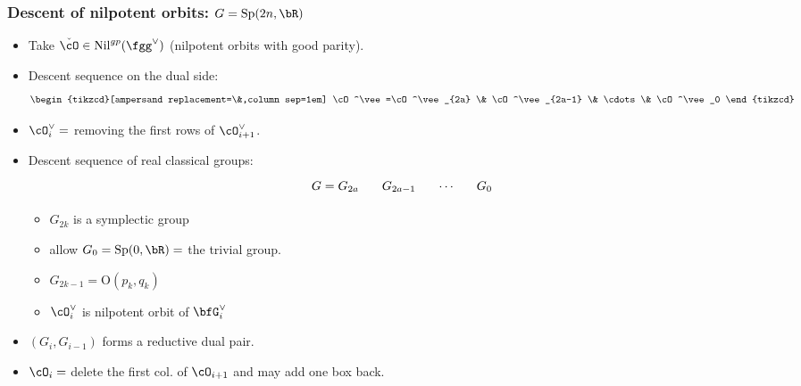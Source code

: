 \documentclass[t,mathserif,11pt,usenames,dvipsnames]{beamer}
\theoremstyle{plain}
\theoremstyle{definition}
\newcommand{\rO}{\mathrm{O}}
\def\Sp{{\mathrm{Sp}}}
\def\ckcO{{\check{\cO}}}
\def\Nil{\mathrm{Nil}}
\def\lblue{\color{blue}}
\def\vcO{\cO^\vee}
\begin{document}
    \begin{frame}[label=CG]
        \frametitle{Descent of nilpotent orbits: $G = \Sp(2n,\bR)$ }
        \begin{itemize}[<+->]
            \item 
            Take $\ckcO\in \Nil^{gp}(\fgg^\vee)$ (nilpotent orbits with good parity).
            \item
            {\lblue Descent sequence on the dual side:}  
            \vspace{-1em}
            \[
            \begin{tikzcd}[ampersand replacement=\&,column sep=1em]
                \vcO =\vcO_{2a} \&  \vcO_{2a-1} \& \cdots \& \vcO_0
            \end{tikzcd}
            \]
            \vspace{-2em}
            \item[] $\vcO_i =$  removing the first rows of $\vcO_{i+1}$.
            \item
            {\lblue 
            Descent sequence of real classical groups:} 
            \vspace{-1em}
            \[
            \begin{tikzcd}[ampersand replacement=\&,column sep=1em]
                G = G_{2a} \&  G_{2a-1} \& \cdots \& G_{0} 
            \end{tikzcd}
            \]
            \vspace{-2em}
            \begin{itemize}
                \item $G_{2k}$ is a symplectic group
                \item[] allow $G_0 = \Sp(0,\bR)=$ the trivial group.
                \item $G_{2k-1} = \rO(p_k,q_k)$
                \item $\vcO_i$ is nilpotent orbit of $\bfG^\vee_{i}$
            \end{itemize}
            \item  $(G_i,G_{i-1})$ forms a reductive dual pair.
            \item $\cO_i = $ delete the first col.  of $\cO_{i+1}$ 
            and may add one box back. %
        \end{itemize}
    \end{frame}
    
\end{document}
